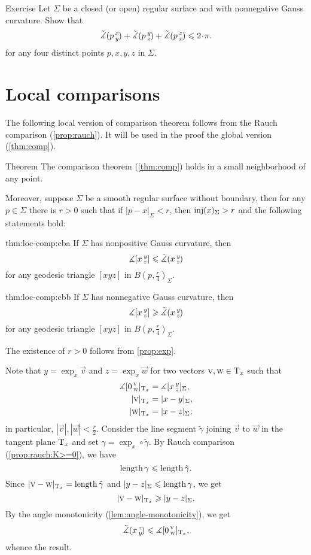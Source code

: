 \begin{thm}{Exercise}\label{ex:sum=<2pi}
Let $\Sigma$ be a closed (or open) regular surface and with nonnegative Gauss curvature.
Show that 
\[\angk pxy+\angk pyz+\angk pzx\le2\cdot \pi.\]
for any four distinct points $p,x,y,z$ in $\Sigma$.
\end{thm}

\section{Local comparisons}\label{sec:loc-comp}

The following local version of comparison theorem follows from the Rauch comparison (\ref{prop:rauch}).
It will be used in the proof the global version (\ref{thm:comp}).

\begin{thm}{Theorem}\label{thm:loc-comp}
The comparison theorem (\ref{thm:comp}) holds in a small neighborhood of any point.

Moreover, suppose $\Sigma$ be a smooth regular surface without boundary,
then for any $p\in \Sigma$ there is $r>0$ such that if $|p-x|_\Sigma<r$, then $\mathop{\rm inj}\nolimits(x)_\Sigma>r$ and the following statements hold:


\begin{subthm}{thm:loc-comp:cba}
If $\Sigma$ has nonpositive Gauss curvature, then 
\[\measuredangle[x\,{}^{y}_{z}]\leqslant\tilde\measuredangle(x\,{}^{y}_{z}\hspace{-0.2ex})\]
for any geodesic triangle $[xyz]$  in $B(p,\tfrac r4)_\Sigma$.
\end{subthm}

\begin{subthm}{thm:loc-comp:cbb}
If $\Sigma$ has nonnegative Gauss curvature, then 
\[\measuredangle[x\,{}^{y}_{z}]\geqslant\tilde\measuredangle(x\,{}^{y}_{z}\hspace{-0.2ex})\]
for any geodesic triangle $[xyz]$ in $B(p,\tfrac r4)_\Sigma$.
\end{subthm}


\end{thm}


The existence of $r>0$ follows from \ref{prop:exp}.

Note that $y=\exp_x\vec v$ and $z=\exp_x\vec w$ for two vectors $\text{\sc{v}},\text{\sc{w}}\in\mathrm{T}_x$ such that 
\begin{align*}
\measuredangle[0\,{}^{\text{\sc{v}}}_{\text{\sc{w}}}]_{\mathrm{T}_x}&=\measuredangle[x\,{}^{y}_{z}]_\Sigma,
\\
|\text{\sc{v}}|_{\mathrm{T}_x}&=|x-y|_\Sigma, 
\\
|\text{\sc{w}}|_{\mathrm{T}_x}&=|x-z|_\Sigma;
\end{align*}
in particular, $|\vec v|, |\vec w|< \tfrac r2$.
Consider the line segment $\tilde \gamma$ joining $\vec v$ to $\vec w$ in the tangent plane $\mathrm{T}_x$ and set $\gamma=\exp_x\circ\tilde \gamma$.
By Rauch comparison (\ref{prop:rauch:K>=0}), we have
\[\mathop{\rm length}\nolimits\gamma\leqslant \mathop{\rm length}\nolimits \tilde \gamma.\]
Since $|\text{\sc{v}}-\text{\sc{w}}|_{\mathrm{T}_x}=\mathop{\rm length}\nolimits\tilde \gamma$ and $|y-z|_{\Sigma}\leqslant \mathop{\rm length}\nolimits\gamma$, we get 
\[|\text{\sc{v}}-\text{\sc{w}}|_{\mathrm{T}_x}\geqslant |y-z|_\Sigma.\]
By the angle monotonicity (\ref{lem:angle-monotonicity}), we get
\[\tilde\measuredangle(x\,{}^{z}_{y}\hspace{-0.2ex})\leqslant\measuredangle[0\,{}^{\text{\sc{v}}}_{\text{\sc{w}}}]_{\mathrm{T}_x},\]
whence the result.

